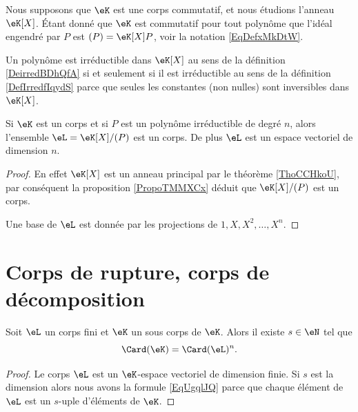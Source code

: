 Nous supposons que \( \eK\) est une corps commutatif, et nous étudions l'anneau \( \eK[X]\). Étant donné que \( \eK\) est commutatif pour tout polynôme que l'idéal engendré par \( P\) est \( (P)=\eK[X]P\), voir la notation \eqref{EqDefxMkDtW}.

\begin{remark}
    Un polynôme est irréductible dans \( \eK[X]\) au sens de la définition \ref{DeirredBDhQfA} si et seulement si il est irréductible au sens de la définition \ref{DefIrredfIqydS} parce que seules les constantes (non nulles) sont inversibles dans \( \eK[X]\).
\end{remark}

\begin{corollary}       \label{CorsLGiEN}
    Si \( \eK\) est un corps et si \( P\) est un polynôme irréductible de degré \( n\), alors l'ensemble \( \eL=\eK[X]/(P)\) est un corps. De plus \( \eL\) est un espace vectoriel de dimension \( n\).
\end{corollary}

\begin{proof}
    En effet \( \eK[X]\) est un anneau principal par le théorème \ref{ThoCCHkoU}, par conséquent la proposition \ref{PropoTMMXCx} déduit que \( \eK[X]/(P)\) est un corps.

    Une base de \( \eL\) est donnée par les projections de \( 1,X,X^2,\ldots, X^n\).
\end{proof}

\section{Corps de rupture, corps de décomposition}

\begin{lemma}       \label{LemobATFP}
    Soit \( \eL\) un corps fini et \( \eK\) un sous corps de \( \eK\). Alors il existe \( s\in \eN\) tel que
    \begin{equation}        \label{EqUgqlJQ}
        \Card(\eK)=\Card(\eL)^n.
    \end{equation}
\end{lemma}

\begin{proof}
    Le corps \( \eL\) est un \( \eK\)-espace vectoriel de dimension finie. Si \( s\) est la dimension alors nous avons la formule \eqref{EqUgqlJQ} parce que chaque élément de \( \eL\) est un \( s\)-uple d'éléments de \( \eK\).
\end{proof}

